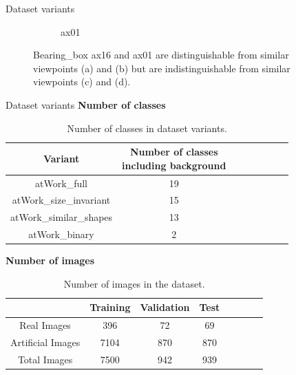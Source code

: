\documentclass{beamer}
\begin{document}
\begin{frame}{Dataset variants}
\begin{small}
\begin{itemize}
\begin{figure}
\begin{subfigure}{.21\textwidth}
  					\caption{ax01}
  					\label{Fig:sim2b}
				\end{subfigure}%
				\caption{Bearing\_box ax16 and ax01 are distinguishable from similar viewpoints (a) and (b) but are indistinguishable from similar viewpoints (c) and (d).}
				\label{Fig:shape}
			\end{figure}
		\end{itemize}
			
	\end{small}

\end{frame}


\begin{frame}{Dataset variants}
	\textbf{Number of classes}
	\begin{small}
		\begin{table}
			\centering
			\begin{tabular}{|c|c|c|c|c|c|c|c|}
			\hline 
    		Variant & \makecell{Number of classes \\ including background} \\ 
			\hline 
			atWork\_full & 19 \\ 
			\hline 
			atWork\_size\_invariant & 15 \\ 
			\hline 
			atWork\_similar\_shapes & 13 \\ 
			\hline 
			atWork\_binary & 2 \\ 
			\hline 
			\end{tabular}
			\caption{Number of classes in dataset variants.}
			\label{Table:meta}
		\end{table}
	\end{small}
		
	\textbf{Number of images}
	\begin{small}	
		\begin{table}
			\centering
			\begin{tabular}{|c|c|c|c|c|c|c|c|}
			\hline 
    		& Training & Validation & Test \\ 
			\hline 
			Real Images & 396 & 72 & 69 \\ 
			\hline 
			Artificial Images & 7104 & 870 & 870 \\ 
			\hline 
			Total Images & 7500 & 942 & 939 \\ 
			\hline 
			\end{tabular}
			\caption{Number of images in the dataset.}
			\label{Table:meta}
		\end{table}
	\end{small}

\end{frame}
\end{document}
